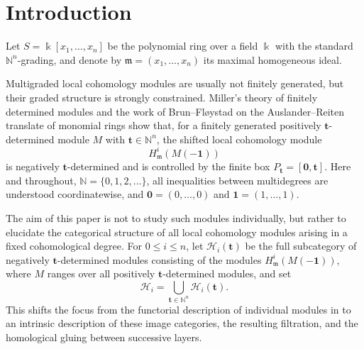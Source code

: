 \documentclass[12pt,reqno]{amsart}
\theoremstyle{definition}
\theoremstyle{remark}
\begin{document}
\begingroup
\setcounter{tocdepth}{1}
\tableofcontents
\endgroup

\section{Introduction}
Let $S=\Bbbk[x_1,\ldots,x_n]$ be the polynomial ring over a field $\Bbbk$ with the standard $\mathbb N^n$-grading, and denote by $\mathfrak m=(x_1,\ldots,x_n)$  its maximal homogeneous ideal.

Multigraded local cohomology modules are usually not finitely generated, but their graded structure is strongly constrained.  Miller's theory of finitely determined modules \cite{Miller} and the work of Brun--Fl\o ystad on the Auslander--Reiten translate of monomial rings \cite{BF} show that, for a finitely generated positively $\mathbf t$-determined module $M$ with $\mathbf t\in \mathbb N^n$, the shifted local cohomology module
\[
H^i_{\mathfrak m}(M(-\mathbf1))
\]
is negatively $\mathbf t$-determined and is controlled by the finite box
$P_{\mathbf t}=[\mathbf0,\mathbf t]$.  Here and throughout,
$\mathbb N=\{0,1,2,\ldots\}$, all inequalities between multidegrees are
understood coordinatewise, and
$\mathbf0=(0,\ldots,0)$ and $\mathbf1=(1,\ldots,1)$.

The aim of this paper is not to study such modules individually, but rather to elucidate the categorical structure of all local cohomology modules arising in a fixed cohomological degree.  For $0\le i\le n$, let $\mathcal H_i(\mathbf t)$ be the full subcategory of negatively $\mathbf t$-determined modules consisting of the modules $H^i_{\mathfrak m}(M(-\mathbf1))$, where $M$ ranges over all positively $\mathbf t$-determined modules, and set
\[
\mathcal H_i=\bigcup_{\mathbf t\in \mathbb N^n}\mathcal H_i(\mathbf t).
\]
This shifts the focus from the functorial description of individual modules in \cite{BF} to an intrinsic description of these image categories, the resulting filtration, and the homological gluing between successive layers.
\end{document}
